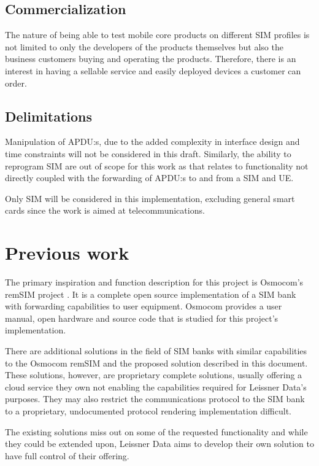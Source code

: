 \subsection{Commercialization}

The nature of being able to test mobile core products on different
SIM profiles is not limited to only the developers of the products
themselves but also the business customers buying and operating the
products. Therefore, there is an interest in having a sellable
service and easily deployed devices a customer can order.

\subsection{Delimitations}

Manipulation of APDU:s, due to the added complexity in interface
design and time constraints will not be considered in this draft.
Similarly, the ability to reprogram SIM are out of scope for this
work as that relates to functionality not directly coupled with
the forwarding of APDU:s to and from a SIM and UE.

Only SIM will be considered in this implementation, excluding
general smart cards since the work is aimed at telecommunications.

\section{Previous work}

The primary inspiration and function description for this project
is Osmocom's remSIM project \cite{osmocom-remsim}. It is a
complete open source implementation of a SIM bank with forwarding
capabilities to user equipment. Osmocom provides a user manual,
open hardware and source code that is studied for this project's
implementation.

There are additional solutions in the field of SIM banks with
similar capabilities to the Osmocom remSIM and the proposed
solution described in this document. These solutions, however, are
proprietary \cite{polygator-sim-bank} complete solutions, usually
offering a cloud service they own \cite{cloud-sim-bank} not
enabling the capabilities required for Leissner Data's purposes.
They may also restrict the communications protocol to the SIM bank
to a proprietary, undocumented protocol rendering implementation
difficult.

The existing solutions miss out on some of the requested
functionality and while they could be extended upon, Leissner Data
aims to develop their own solution to have full control of their
offering.


